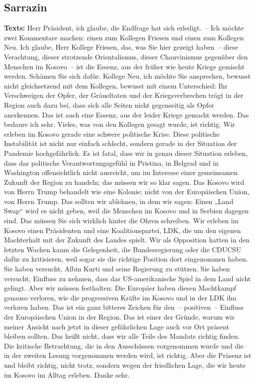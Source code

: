 \documentclass{article}
\begin{document}
\subsection{Sarrazin}
\noindent\textbf{Texts:} Herr Präsident, ich glaube, die Endfrage hat sich erledigt. – Ich möchte zwei Kommentare machen: einen zum Kollegen Friesen und einen zum Kollegen Neu. Ich glaube, Herr Kollege Friesen, das, was Sie hier gezeigt haben – diese Verachtung, dieser strotzende Orientalismus, dieser Chauvinismus gegenüber den Menschen im Kosovo – ist die Essenz, aus der früher wie heute Kriege gemischt werden. Schämen Sie sich dafür.  Kollege Neu, ich möchte Sie ansprechen, bewusst nicht gleichsetzend mit dem Kollegen, bewusst mit einem Unterschied: Ihr Verschweigen der Opfer, der Gräueltaten und der Kriegsverbrechen  trägt in der Region auch dazu bei, dass sich alle Seiten nicht gegenseitig als Opfer anerkennen. Das ist auch eine Essenz, aus der leider Kriege gemacht werden. Das bedaure ich sehr.  Vieles, was von den Kollegen gesagt wurde, ist richtig. Wir erleben im Kosovo gerade eine schwere politische Krise. Diese politische Instabilität ist nicht nur einfach schlecht, sondern gerade in der Situation der Pandemie hochgefährlich. Es ist fatal, dass wir in genau dieser Situation erleben, dass das politische Verantwortungsgefühl in Pristina, in Belgrad und in Washington offensichtlich nicht ausreicht, um im Interesse einer gemeinsamen Zukunft der Region zu handeln; das müssen wir so klar sagen. Das Kosovo wird von Herrn Trump behandelt wie eine Kolonie; nicht von der Europäischen Union, von Herrn Trump.  Das sollten wir ablehnen, in dem wir sagen: Einen „Land Swap“ wird es nicht geben,  weil die Menschen im Kosovo und in Serbien dagegen sind. Das müssen Sie sich wirklich hinter die Ohren schreiben.  Wir erleben im Kosovo einen Präsidenten und eine Koalitionspartei, LDK, die um den eigenen Machterhalt mit der Zukunft des Landes spielt. Wir als Opposition hatten in den letzten Wochen kaum die Gelegenheit, die Bundesregierung oder die CDU\/CSU dafür zu kritisieren, weil sogar sie die richtige Position dort eingenommen haben. Sie haben versucht, Albin Kurti und seine Regierung zu stützen. Sie haben versucht, Einfluss zu nehmen, dass das US-amerikanische Spiel in dem Land nicht gelingt.  Aber wir müssen festhalten: Die Europäer haben diesen Machtkampf genauso verloren, wie die progressiven Kräfte im Kosovo und in der LDK ihn verloren haben. Das ist ein ganz bitteres Zeichen für den – positiven – Einfluss der Europäischen Union in der Region. Das ist einer der Gründe, warum wir meiner Ansicht nach jetzt in dieser gefährlichen Lage auch vor Ort präsent bleiben sollten. Das heißt nicht, dass wir alle Teile des Mandats richtig finden. Die kritische Betrachtung, die in den Ausschüssen vorgenommen wurde und die in der zweiten Lesung vorgenommen werden wird, ist richtig. Aber die Präsenz ist und bleibt richtig, nicht trotz, sondern wegen der friedlichen Lage, die wir heute im Kosovo im Alltag erleben. Danke sehr.  
\end{document}
